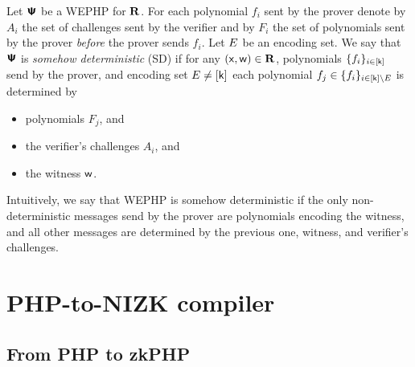 \documentclass[runningheads,11pt]{llncs}
\begin{document}
\begin{definition}
  \label{def:sdwephp}
  Let $\bm{\mathsf{\Psi}}$ be a WEPHP for $\mathbf{R}$. For each polynomial $f_i$ sent by the prover
  denote by $A_i$ the set of challenges sent by the verifier and by $F_i$ the
  set of polynomials sent by the prover \emph{before} the prover sends
  $f_i$. Let $E$ be an encoding set. We say that $\bm{\mathsf{\Psi}}$ is \emph{somehow
    deterministic} (SD) if for any $(\mathsf{x}, \mathsf{w}) \in \mathbf{R}$, polynomials
  $\{f_i\}_{i \in [\mathsf{k}]}$ send by the prover, and encoding set
  $E \neq [\mathsf{k}]$ each polynomial
  $f_j \in \{f_i\}_{i \in [\mathsf{k}] \setminus E}$ is determined by
  \begin{itemize}
    \item polynomials $F_j$, and
    \item the verifier's challenges $A_i$, and
    \item the witness $\mathsf{w}$.
  \end{itemize}
\end{definition}
Intuitively, we say that WEPHP is somehow deterministic if the only
non-deterministic messages send by the prover are polynomials encoding the
witness, and all other messages are determined by the previous one, witness, and
verifier's challenges.

\section{PHP-to-NIZK compiler}

\subsection{From PHP to zkPHP}
\end{document}
